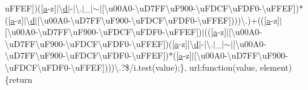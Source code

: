 \begin{DoxyCompactItemize}
u\+F\+F\+E\+F\mbox{]})(\mbox{[}\hyperlink{jquery_8unobtrusive-ajax_8min_8js_a9cf3d65797f4cbe9deaab01492290370}{a}-\/z\mbox{]}$\vert$\textbackslash{}\hyperlink{_scripts_2respond_8min_8js_aeb337d295abaddb5ec3cb34cc2e2bbc9}{d}$\vert$-\/$\vert$\textbackslash{}.$\vert$\+\_\+$\vert$$\sim$$\vert$\mbox{[}\textbackslash{}u00\+A0-\/\textbackslash{}u\+D7\+F\+F\textbackslash{}u\+F900-\/\textbackslash{}u\+F\+D\+C\+F\textbackslash{}u\+F\+D\+F0-\/\textbackslash{}u\+F\+F\+E\+F\mbox{]})$\ast$(\mbox{[}\hyperlink{jquery_8unobtrusive-ajax_8min_8js_a9cf3d65797f4cbe9deaab01492290370}{a}-\/z\mbox{]}$\vert$\textbackslash{}\hyperlink{_scripts_2respond_8min_8js_aeb337d295abaddb5ec3cb34cc2e2bbc9}{d}$\vert$\mbox{[}\textbackslash{}u00\+A0-\/\textbackslash{}u\+D7\+F\+F\textbackslash{}u\+F900-\/\textbackslash{}u\+F\+D\+C\+F\textbackslash{}u\+F\+D\+F0-\/\textbackslash{}u\+F\+F\+E\+F\mbox{]})))\textbackslash{}.)+((\mbox{[}\hyperlink{jquery_8unobtrusive-ajax_8min_8js_a9cf3d65797f4cbe9deaab01492290370}{a}-\/z\mbox{]}$\vert$\mbox{[}\textbackslash{}u00\+A0-\/\textbackslash{}u\+D7\+F\+F\textbackslash{}u\+F900-\/\textbackslash{}u\+F\+D\+C\+F\textbackslash{}u\+F\+D\+F0-\/\textbackslash{}u\+F\+F\+E\+F\mbox{]})$\vert$((\mbox{[}\hyperlink{jquery_8unobtrusive-ajax_8min_8js_a9cf3d65797f4cbe9deaab01492290370}{a}-\/z\mbox{]}$\vert$\mbox{[}\textbackslash{}u00\+A0-\/\textbackslash{}u\+D7\+F\+F\textbackslash{}u\+F900-\/\textbackslash{}u\+F\+D\+C\+F\textbackslash{}u\+F\+D\+F0-\/\textbackslash{}u\+F\+F\+E\+F\mbox{]})(\mbox{[}\hyperlink{jquery_8unobtrusive-ajax_8min_8js_a9cf3d65797f4cbe9deaab01492290370}{a}-\/z\mbox{]}$\vert$\textbackslash{}\hyperlink{_scripts_2respond_8min_8js_aeb337d295abaddb5ec3cb34cc2e2bbc9}{d}$\vert$-\/$\vert$\textbackslash{}.$\vert$\+\_\+$\vert$$\sim$$\vert$\mbox{[}\textbackslash{}u00\+A0-\/\textbackslash{}u\+D7\+F\+F\textbackslash{}u\+F900-\/\textbackslash{}u\+F\+D\+C\+F\textbackslash{}u\+F\+D\+F0-\/\textbackslash{}u\+F\+F\+E\+F\mbox{]})$\ast$(\mbox{[}\hyperlink{jquery_8unobtrusive-ajax_8min_8js_a9cf3d65797f4cbe9deaab01492290370}{a}-\/z\mbox{]}$\vert$\mbox{[}\textbackslash{}u00\+A0-\/\textbackslash{}u\+D7\+F\+F\textbackslash{}u\+F900-\/\textbackslash{}u\+F\+D\+C\+F\textbackslash{}u\+F\+D\+F0-\/\textbackslash{}u\+F\+F\+E\+F\mbox{]})))\textbackslash{}.?\$/i.\+test(value);\}, url\+:function(value, element)\{return 
\end{DoxyCompactItemize}
